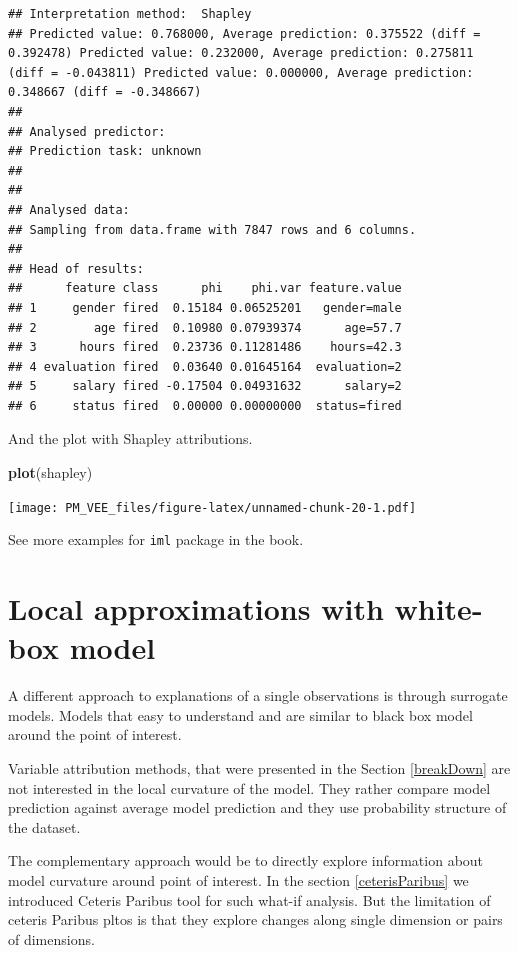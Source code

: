 \documentclass[]{krantz}
\newenvironment{Shaded}{\begin{snugshade}}{\end{snugshade}}
\newcommand{\KeywordTok}[1]{\textcolor[rgb]{0.13,0.29,0.53}{\textbf{#1}}}
\newcommand{\NormalTok}[1]{#1}
\theoremstyle{definition}
\theoremstyle{definition}
\theoremstyle{definition}
\theoremstyle{remark}
\begin{document}
\begin{verbatim}
## Interpretation method:  Shapley 
## Predicted value: 0.768000, Average prediction: 0.375522 (diff = 0.392478) Predicted value: 0.232000, Average prediction: 0.275811 (diff = -0.043811) Predicted value: 0.000000, Average prediction: 0.348667 (diff = -0.348667)
## 
## Analysed predictor: 
## Prediction task: unknown 
## 
## 
## Analysed data:
## Sampling from data.frame with 7847 rows and 6 columns.
## 
## Head of results:
##      feature class      phi    phi.var feature.value
## 1     gender fired  0.15184 0.06525201   gender=male
## 2        age fired  0.10980 0.07939374      age=57.7
## 3      hours fired  0.23736 0.11281486    hours=42.3
## 4 evaluation fired  0.03640 0.01645164  evaluation=2
## 5     salary fired -0.17504 0.04931632      salary=2
## 6     status fired  0.00000 0.00000000  status=fired
\end{verbatim}

And the plot with Shapley attributions.

\begin{Shaded}
\begin{Highlighting}[]
\KeywordTok{plot}\NormalTok{(shapley)}
\end{Highlighting}
\end{Shaded}

\texttt{[image: PM\_VEE\_files/figure-latex/unnamed-chunk-20-1.pdf]}

See more examples for \texttt{iml} package in the \citep{molnar} book.

\hypertarget{LIME}{%
\section{Local approximations with white-box model}\label{LIME}}

A different approach to explanations of a single observations is through
surrogate models. Models that easy to understand and are similar to
black box model around the point of interest.

Variable attribution methods, that were presented in the Section
\ref{breakDown} are not interested in the local curvature of the model.
They rather compare model prediction against average model prediction
and they use probability structure of the dataset.

The complementary approach would be to directly explore information
about model curvature around point of interest. In the section
\ref{ceterisParibus} we introduced Ceteris Paribus tool for such what-if
analysis. But the limitation of ceteris Paribus pltos is that they
explore changes along single dimension or pairs of dimensions.
\end{document}
